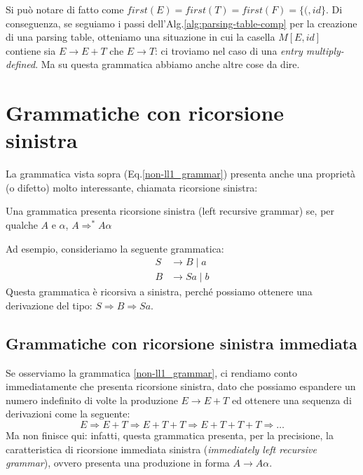 \documentclass[class=book, crop=false, oneside, 12pt]{standalone}
\begin{document}

Si può notare di fatto come \(first(E) = first(T) = first(F) = \{(, id\}\).
Di conseguenza, se seguiamo i passi dell'Alg.\ref{alg:parsing-table-comp} per la creazione di una parsing table, otteniamo una situazione in cui la casella \(M[E, id]\) contiene sia \(E \to E+T\) che \(E \to T\): ci troviamo nel caso di una \emph{entry multiply-defined}. Ma su questa grammatica abbiamo anche altre cose da dire.

\section{Grammatiche con ricorsione sinistra}
La grammatica vista sopra (Eq.\ref{non-ll1_grammar}) presenta anche una proprietà (o difetto) molto interessante, chiamata ricorsione sinistra:
\begin{definition}
    Una grammatica presenta ricorsione sinistra (left recursive grammar) se, per qualche \(A\) e \(\alpha\), \(A \Rightarrow^* A\alpha\)
\end{definition}

Ad esempio, consideriamo la seguente grammatica:
\begin{align*}
    S &\to B \mid a \\
    B &\to Sa \mid b
\end{align*}
Questa grammatica è ricorsiva a sinistra, perché possiamo ottenere una derivazione del tipo: \(S \Rightarrow B \Rightarrow Sa\).

\subsection{Grammatiche con ricorsione sinistra immediata}
Se osserviamo la grammatica \ref{non-ll1_grammar}, ci rendiamo conto immediatamente che presenta ricorsione sinistra, dato che possiamo espandere un numero indefinito di volte la produzione \(E \to E+T\) ed ottenere una sequenza di derivazioni come la seguente:
\begin{equation*}
    E \Rightarrow E+T \Rightarrow E+T+T \Rightarrow E+T+T+T \Rightarrow \dots
\end{equation*}
Ma non finisce qui: infatti, questa grammatica presenta, per la precisione, la caratteristica di ricorsione immediata sinistra (\emph{immediately left recursive grammar}), ovvero presenta una produzione in forma \(A \to A\alpha\).
\end{document}
